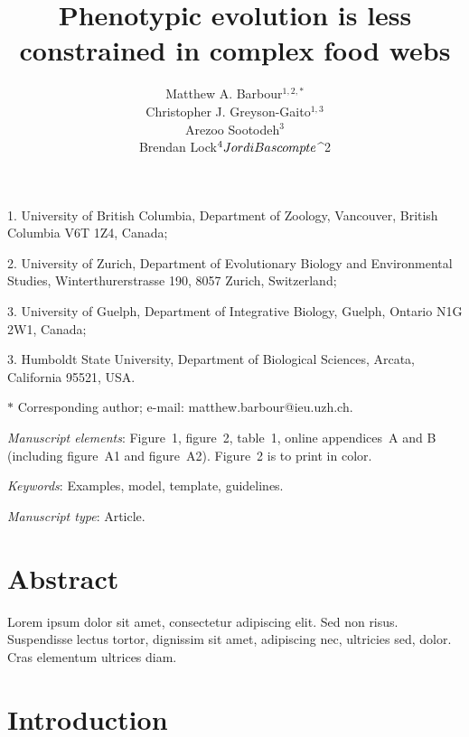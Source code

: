 \documentclass[11pt]{article}
\title{Phenotypic evolution is less constrained in complex food webs}
\author{Matthew A. Barbour$^{1,2,\ast}$ \\ 
Christopher J. Greyson-Gaito$^{1,3}$ \\ 
Arezoo Sootodeh$^{3}$ \\
Brendan Lock$^{4} \\
Jordi Bascompte$^{2}}
\date{}
\begin{document}
\maketitle

\noindent{} 1. University of British Columbia, Department of Zoology, Vancouver, British Columbia V6T 1Z4, Canada;

\noindent{} 2. University of Zurich, Department of Evolutionary Biology and Environmental Studies, Winterthurerstrasse 190, 8057 Zurich, Switzerland;

\noindent{} 3. University of Guelph, Department of Integrative Biology, Guelph, Ontario N1G 2W1, Canada;

\noindent{} 3. Humboldt State University, Department of Biological Sciences, Arcata, California 95521, USA.

\noindent{} $\ast$ Corresponding author; e-mail: matthew.barbour@ieu.uzh.ch.

\bigskip

\textit{Manuscript elements}: Figure~1, figure~2, table~1, online appendices~A and B (including figure~A1 and figure~A2). Figure~2 is to print in color.

\bigskip

\textit{Keywords}: Examples, model, template, guidelines.

\bigskip

\textit{Manuscript type}: Article. %

\bigskip



\newpage{}

\section*{Abstract}

Lorem ipsum dolor sit amet, consectetur adipiscing elit. Sed non risus. Suspendisse lectus tortor, dignissim sit amet, adipiscing nec, ultricies sed, dolor. Cras elementum ultrices diam. 

\newpage{}

\section*{Introduction}
\end{document}
